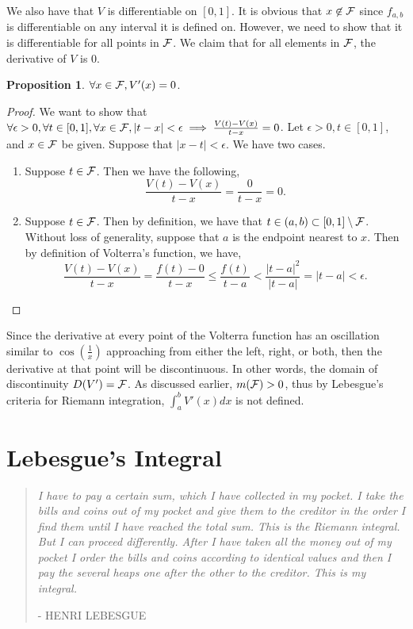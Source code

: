 \documentclass{article}
\theoremstyle{axiom} \newtheorem{axiom}{Axiom}
\theoremstyle{definition} \newtheorem{definition}{Definition}
\theoremstyle{example} \newtheorem{example}{Example}
\theoremstyle{proposition} \newtheorem{prop}{Proposition}
\theoremstyle{lemma} \newtheorem{lemma}{Lemma}
\begin{document}
We also have that $V$ is differentiable on $[0,1]$. It is obvious that $x
\not \in \mathcal{F}$ since $f_{a,b}$ is differentiable on any interval it is defined on. 
However, we need to show that it is differentiable for all points in $\mathcal{F}$. We 
claim that for all elements in $\mathcal{F}$, the derivative of $V$ is $0$.
\begin{prop}
	$\forall x \in \mathcal{F}, V'(x) = 0$. 
\end{prop}
\begin{proof}
	We want to show that $\forall \epsilon > 0, \forall t \in [0,1], \forall x
	\in \mathcal{F}, |t-x|<\epsilon \implies \frac{V(t) - V(x)}{t-x} = 0$. Let $\epsilon
	>0, t\in [0,1]$, and $x \in \mathcal{F}$ be given. Suppose that $|x-t|<\epsilon$.
	We have two cases. 
	\begin{enumerate}
		\item Suppose $t \in \mathcal{F}$. Then we have the following,
		\begin{equation*}
			\frac{V(t) - V(x)}{t-x} = \frac{0}{t-x} = 0.
		\end{equation*}
		\item Suppose $t \in \mathcal{F}$. Then by definition, we have that 
		$t\in (a,b) \subset [0,1]\setminus \mathcal{F}$. Without loss of generality,
		suppose that $a$ is the endpoint nearest to $x$. Then by definition
		of Volterra's function, we have,
		\begin{equation*}
			\frac{V(t) - V(x)}{t-x} = \frac{f(t)-0}{t-x} \leq \frac{f(t)}{t-a} <
			\frac{|t-a|^2}{|t-a|} = |t-a| < \epsilon.
		\end{equation*}
	\end{enumerate}
\end{proof}

Since the derivative at every point of the Volterra function has an oscillation 
similar to $\cos(\frac{1}{x})$ approaching from either the left, right, or
both, then the derivative at that point will be discontinuous. In other words,
the domain of discontinuity $D(V') = \mathcal{F}$. As discussed earlier, $m(\mathcal{F}) >0$,
thus by Lebesgue's criteria for Riemann integration, $\int_a^b V'(x)dx$ is not
defined.

\section{Lebesgue's Integral}
\begin{quote}
\textit{I have to pay a certain sum, which I have collected in my pocket. I take the
bills and coins out of my pocket and give them to the creditor in the order I
find them until I have reached the total sum. This is the Riemann integral. But
I can proceed differently. After I have taken all the money out of my pocket I
order the bills and coins according to identical values and then I pay the
several heaps one after the other to the creditor. This is my integral.}

\uppercase{\tiny{- Henri Lebesgue}}
\end{quote}
\end{document}
